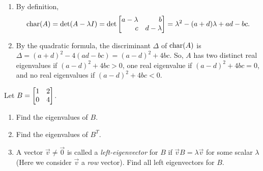 \begin{exercises}
\begin{problist}
		\begin{solution}
		    \begin{enumerate}
		        \item  By definition,
        		\begin{align*}
        		    \Char(A) = \det (A - \lambda I) = \det \mat{a - \lambda & b \\ c & d - \lambda} = \lambda^2 - (a + d)\lambda + ad - bc.
        		\end{align*}
        		\item By the quadratic formula, the discriminant $\Delta$ of $\operatorname{char}(A)$ is $\Delta = (a + d)^2 - 4(ad - bc) = (a - d)^2  + 4 bc$. So, $A$ has two distinct real eigenvalues if $(a - d)^2 + 4bc > 0$, one real eigenvalue if $(a - d)^2 + 4bc = 0$, and no real eigenvalues if $(a - d)^2 + 4bc < 0.$
		    \end{enumerate}
		\end{solution}

		\prob Let $B=\mat{1&2\\0&4}$.
		\begin{enumerate}
			\item Find the eigenvalues of $B$.
			\item Find the eigenvalues of $B^T$.
			\item A vector $\vec v\neq\vec 0$ is called a \emph{left-eigenvector} for $B$ if
				$\vec vB=\lambda \vec v$ for some scalar $\lambda$ (Here we consider $\vec v$ a \emph{row} vector). Find all
				left eigenvectors for $B$.
		\end{enumerate}


\end{problist}
\end{exercises}
